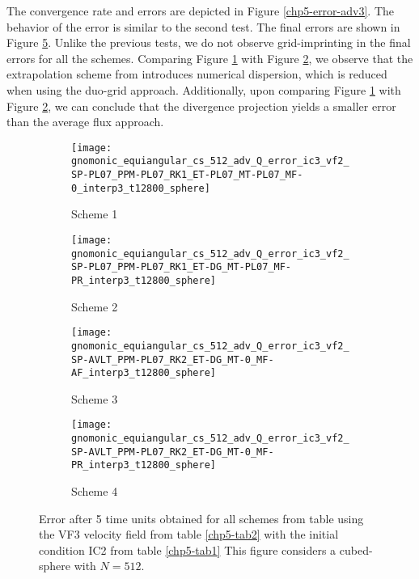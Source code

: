 The convergence rate and errors are depicted in Figure \ref{chp5-error-adv3}.
The behavior of the error is similar to the second test.
The final errors are shown in Figure \ref{chp5-adv3}.
Unlike the previous tests, we do not observe grid-imprinting in the final errors for all the schemes.
Comparing Figure \ref{chp5-adv3-s1} with Figure \ref{chp5-adv3-s2}, we observe that the extrapolation scheme from \citet{putman:2007}
introduces numerical dispersion, which is reduced when using the duo-grid approach.
Additionally, upon comparing Figure \ref{chp5-adv3-s1} with Figure \ref{chp5-adv3-s2},
we can conclude that the divergence projection yields a smaller error than the average flux approach.
\begin{figure}[!htb]
	\centering
	\begin{subfigure}{0.35\textwidth}
		\centering
		\texttt{[image: gnomonic\_equiangular\_cs\_512\_adv\_Q\_error\_ic3\_vf2\_SP-PL07\_PPM-PL07\_RK1\_ET-PL07\_MT-PL07\_MF-0\_interp3\_t12800\_sphere]}
		\caption{Scheme 1 \label{chp5-adv3-s1}}
	\end{subfigure}
	\begin{subfigure}{0.35\textwidth}
		\centering
		\texttt{[image: gnomonic\_equiangular\_cs\_512\_adv\_Q\_error\_ic3\_vf2\_SP-PL07\_PPM-PL07\_RK1\_ET-DG\_MT-PL07\_MF-PR\_interp3\_t12800\_sphere]}
		\caption{Scheme 2 \label{chp5-adv3-s2}}
	\end{subfigure}
	
	\begin{subfigure}{0.35\textwidth}
		\centering
		\texttt{[image: gnomonic\_equiangular\_cs\_512\_adv\_Q\_error\_ic3\_vf2\_SP-AVLT\_PPM-PL07\_RK2\_ET-DG\_MT-0\_MF-AF\_interp3\_t12800\_sphere]}
		\caption{Scheme 3 \label{chp5-adv3-s3}}
	\end{subfigure}
	\begin{subfigure}{0.35\textwidth}
		\centering
		\texttt{[image: gnomonic\_equiangular\_cs\_512\_adv\_Q\_error\_ic3\_vf2\_SP-AVLT\_PPM-PL07\_RK2\_ET-DG\_MT-0\_MF-PR\_interp3\_t12800\_sphere]}
		\caption{Scheme 4 \label{chp5-adv3-s4}}
	\end{subfigure}
	\caption{ Error after 5 time units obtained for all schemes from table using the VF3 velocity field from table \ref{chp5-tab2} with the initial condition IC2 from  table \ref{chp5-tab1} 
		This figure considers a cubed-sphere with $N=512$. \label{chp5-adv3}}
\end{figure}

